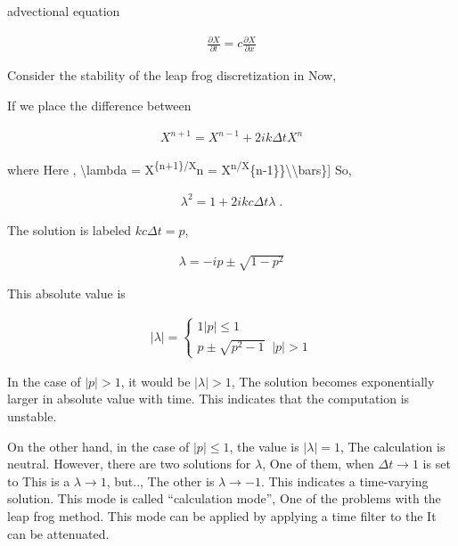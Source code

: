 advectional equation

\begin{eqnarray}
  \frac{\partial X}{\partial t} = c \frac{\partial X}{\partial x}
\end{eqnarray}

Consider the stability of the leap frog discretization in Now,

If we place the difference between

\begin{eqnarray}
  X^{n+1} = X^{n-1} + 2 i k \Delta t X^n
\end{eqnarray}

where Here , \textbackslash lambda = X\textsuperscript{\{n+1\}/X}n =
X\textsuperscript{n/X}\{n-1\}\}\textbackslash\textbackslash bars\}{]}
So,

\begin{eqnarray}
  \lambda^2 = 1 + 2 i kc \Delta t \lambda \; .
\end{eqnarray}

The solution is labeled \(kc \Delta t = p\),

\begin{eqnarray}
 \lambda = -i p \pm \sqrt{1-p^2}
\end{eqnarray}

This absolute value is

\begin{eqnarray}
  |\lambda| = \left\{ 
             \begin{array}{ll}
               1                      |p| \le 1 \\
               p \pm \sqrt{p^2-1} \;\;    |p| > 1
             \end{array}
             \right.
\end{eqnarray}

In the case of \(|p|>1\), it would be \(|\lambda| > 1\), The solution
becomes exponentially larger in absolute value with time. This indicates
that the computation is unstable.

On the other hand, in the case of \(|p| \le 1\), the value is
\(|\lambda| = 1\), The calculation is neutral. However, there are two
solutions for \(\lambda\), One of them, when \(\Delta t \rightarrow 1\)
is set to This is a \(\lambda \rightarrow 1\), but.., The other is
\(\lambda \rightarrow -1\). This indicates a time-varying solution. This
mode is called ``calculation mode'', One of the problems with the leap
frog method. This mode can be applied by applying a time filter to the
It can be attenuated.

